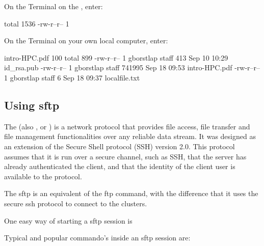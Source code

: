 On the Terminal on the \hpc, enter:

\begin{prompt}
total 1536
-rw-r--r-- 1 %
\end{prompt}

On the Terminal on your own local computer, enter:

\begin{prompt}
intro-HPC.pdf 100%
total  899
-rw-r--r--   1 gborstlap  staff     413 Sep 10 10:29 id_rsa.pub
-rw-r--r--   1 gborstlap  staff  741995 Sep 18 09:53 intro-HPC.pdf
-rw-r--r--   1 gborstlap  staff       6 Sep 18 09:37 localfile.txt
\end{prompt}

\subsection{Using sftp}

The  (also , or ) is a network protocol that provides file access,
file transfer and file management functionalities over any reliable data
stream. It was designed as an extension of the Secure Shell protocol (SSH)
version 2.0. This protocol assumes that it is run over a secure channel, such
as SSH, that the server has already authenticated the client, and that the
identity of the client user is available to the protocol.

The sftp is an equivalent of the ftp command, with the difference that it uses
the secure ssh protocol to connect to the clusters.

One easy way of starting a sftp session is
\begin{prompt}
\end{prompt}

Typical and popular commando's inside an sftp session are:


